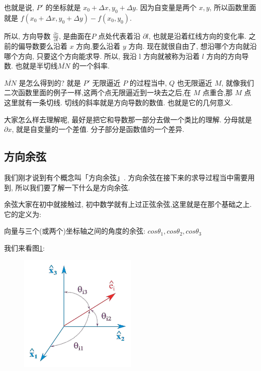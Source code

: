 也就是说, $P'$ 的坐标就是 $x_0 + \Delta x, y_0+\Delta y$. 因为自变量是两个 $x, y$, 所以函数里面就是 $f(x_0 + \Delta x, y_0+\Delta y) - f(x_0, y_0)$. 

所以, 方向导数 $\frac{\partial z}{\partial l}$, 是曲面在$P$ 点处代表着沿 $\partial l$, 也就是沿着红线方向的变化率. 之前的偏导数要么沿着 $x$ 方向,要么沿着 $y$ 方向. 现在就很自由了, 想沿哪个方向就沿哪个方向, 只要这个方向能求导. 所以, 我沿 l 方向就被称为沿着 $l$ 方向的方向导数. 也就是半切线$\overline {MN}$ 的一个斜率. 

$\overline {MN}$ 是怎么得到的? 就是 $P'$ 无限逼近 $P$ 的过程当中, $Q$ 也无限逼近 $M$, 就像我们二次函数里面的例子一样,这两个点无限逼近到一块去之后,在 $M$ 点重合,那 $M$ 点这里就有一条切线. 切线的斜率就是方向导数的数值. 也就是它的几何意义. 

大家怎么样去理解呢, 最好是把它和导数那一部分去做一个类比的理解. 分母就是 $\partial x$, 就是自变量的一个差值. 分子部分是函数值的一个差异. 

\subsection{方向余弦}

我们刚才说到有个概念叫「方向余弦」. 方向余弦在接下来的求导过程当中需要用到, 所以我们要了解一下什么是方向余弦. 

余弦大家在初中就接触过, 初中数学就有上过正弦余弦,这里就是在那个基础之上. 它的定义为: 

\begin{newquotation}
  向量与三个(或两个)坐标轴之间的角度的余弦: $cos \theta_1, cos \theta_2, cos \theta_3$
\end{newquotation}

我们来看图\ref{fig:img12_5}: 

\begin{figure}[ht]
  \centering
  \includegraphics[width=0.5\textwidth]{asset/20230901155252.png}
  \caption{}
  \label{fig:img12_5}
\end{figure}

